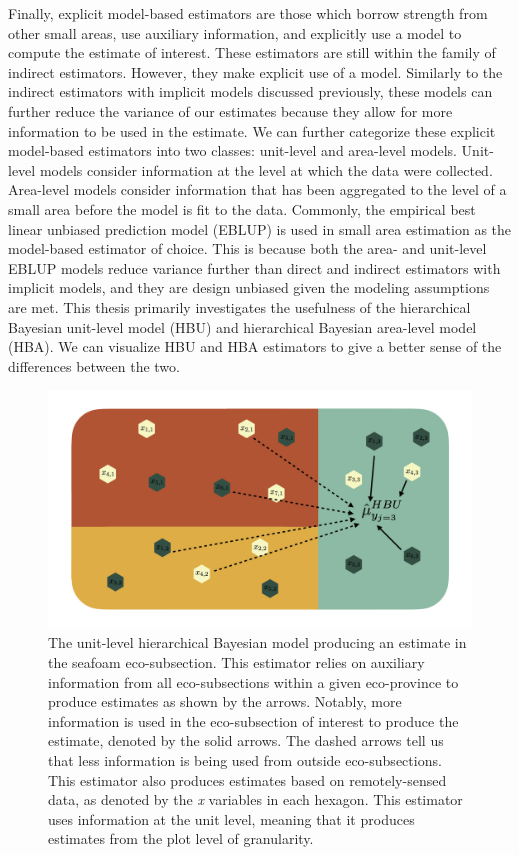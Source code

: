 \documentclass[12pt,twoside]{reedthesis}
\begin{document}
Finally, explicit model-based estimators are those which borrow strength from other small areas, use auxiliary information, and explicitly use a model to compute the estimate of interest. These estimators are still within the family of indirect estimators. However, they make explicit use of a model. Similarly to the indirect estimators with implicit models discussed previously, these models can further reduce the variance of our estimates because they allow for more information to be used in the estimate. We can further categorize these explicit model-based estimators into two classes: unit-level and area-level models. Unit-level models consider information at the level at which the data were collected. Area-level models consider information that has been aggregated to the level of a small area before the model is fit to the data. Commonly, the empirical best linear unbiased prediction model (EBLUP) is used in small area estimation as the model-based estimator of choice. This is because both the area- and unit-level EBLUP models reduce variance further than direct and indirect estimators with implicit models, and they are design unbiased given the modeling assumptions are met. This thesis primarily investigates the usefulness of the hierarchical Bayesian unit-level model (HBU) and hierarchical Bayesian area-level model (HBA). We can visualize HBU and HBA estimators to give a better sense of the differences between the two.
\begin{figure}

{\centering \includegraphics[width=1\linewidth]{figure/hbu-diagram} 

}

\caption[The unit-level hierarchical Bayesian model]{The unit-level hierarchical Bayesian model producing an estimate in the seafoam eco-subsection. This estimator relies on auxiliary information from all eco-subsections within a given eco-province to produce estimates as shown by the arrows. Notably, more information is used in the eco-subsection of interest to produce the estimate, denoted by the solid arrows. The dashed arrows tell us that less information is being used from outside eco-subsections. This estimator also produces estimates based on remotely-sensed data, as denoted by the \textit{x} variables in each hexagon. This estimator uses information at the unit level, meaning that it produces estimates from the plot level of granularity.}\label{fig:hbu-diagram}
\end{figure}
\end{document}
